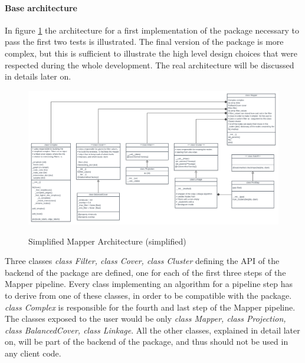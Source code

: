 \paragraph{Base architecture}
In figure \ref{fig:basearchitecture} the architecture for a first implementation of the package necessary to pass the first two tests is illustrated. The final version of the package is more complex, but this is sufficient to illustrate the high level design choices that were respected during the whole development. The real architecture will be discussed in details later on.\\
\begin{figure}[h]
	\caption{Simplified Mapper Architecture (simplified)}
	\centering
	\includegraphics[width=1\textwidth]{Figs/SimplifiedArchitecture.png}
	\label{fig:basearchitecture}
\end{figure}
Three classes \textit{class Filter, class Cover, class Cluster} defining the API of the backend of the package are defined, one for each of the first three steps of the Mapper pipeline. Every class implementing an algorithm for a pipeline step has to derive from one of these classes,  in order to be compatible with the package. \textit{class Complex} is responsible for the fourth and last step of the Mapper pipeline. The classes exposed to the user would be only \textit{class Mapper, class Projection, class BalancedCover, class Linkage}. All the other classes, explained in detail later on, will be part of the backend of the package, and thus should not be used in any client code.

